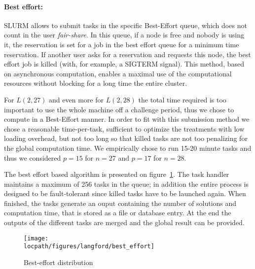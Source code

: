 \paragraph{Best effort: }
SLURM allows to submit tasks in the specific Best-Effort queue, which does not count in the user \textit{fair-share}. In this queue, if a node is free and nobody is using it, the reservation is set for a job in the best effort queue for a minimum time reservation. 
If another user asks for a reservation and requests this node, the best effort job is killed (with, for example, a SIGTERM signal). This method, based on asynchronous computation, enables a maximal use of the computational resources without blocking for a long time the entire cluster.

For $L(2,27)$ and even more for $L(2,28)$ the total time required is too important to use the whole machine off a challenge period, thus we chose to compute in a Best-Effort manner.
In order to fit with this submission method we chose a reasonable time-per-task, sufficient to optimize the treatments with low loading overhead, but not too long so that killed tasks are not too penalizing for the global computation time. We empirically chose to run 15-20 minute tasks and thus we considered $p=15$ for $n=27$ and $p=17$ for $n=28$. 

The best effort based algorithm is presented on figure~\ref{fig:graphe_besteffort}.
The task handler maintains a maximum of 256 tasks in the queue; in addition the entire process is designed to be fault-tolerant since killed tasks have to be launched again.
When finished, the tasks generate an ouput containing the number of solutions and computation time, that is stored as a file or database entry. 
At the end the outputs of the different tasks are merged and the global result can be provided.  

\begin{figure}[t!]
\centering
\texttt{[image: \\locpath/figures/langford/best\_effort]}
\caption{Best-effort distribution}
\label{fig:graphe_besteffort}
\end{figure}

